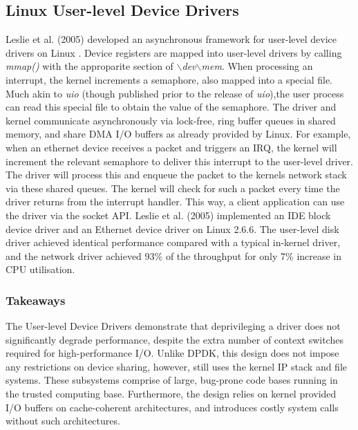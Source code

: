 \subsection{Linux User-level Device Drivers}\label{user_level_dd}
Leslie et al. (2005) developed an asynchronous framework for user-level device drivers on Linux \cite{Leslie_CFGGMPSEH_05}. 
Device registers are mapped into user-level drivers by calling \emph{mmap()} with the approparite section of \emph{$\backslash$dev$\backslash$mem}. 
When processing an interrupt, the kernel increments a semaphore, also mapped into a special file. Much akin to \emph{uio} 
(though published prior to the release of \emph{uio}),the user process can read this special file to obtain the value of the semaphore. 
The driver and kernel communicate
asynchronously via lock-free, ring buffer queues in shared memory, and share DMA I/O buffers as already provided by Linux. 
For example, when an ethernet device receives a packet 
and triggers an IRQ, the kernel will increment the relevant semaphore to deliver this interrupt to the user-level driver. 
The driver will process this and enqueue the packet to the kernels network stack via these shared queues. The kernel will
check for such a packet every time the driver returns from the interrupt handler. This way, a client application
can use the driver via the socket API. Leslie et al. (2005) implemented an IDE block device driver and an Ethernet device driver
on Linux 2.6.6. The user-level disk driver achieved identical performance compared with a typical in-kernel driver, and the 
network driver achieved 93\% of the throughput for only 7\% increase in CPU utilisation. 

\subsubsection{Takeaways}
The User-level Device Drivers demonstrate that deprivileging a driver does not significantly degrade performance, despite the extra
number of context switches required for high-performance I/O. Unlike DPDK, this design does not impose any restrictions on device sharing,
however, still uses the kernel IP stack and file systems. These subsystems comprise of large, bug-prone code bases running in the trusted computing base.
Furthermore, the design relies on kernel provided I/O buffers on cache-coherent architectures, and introduces costly system calls without such
architectures.

